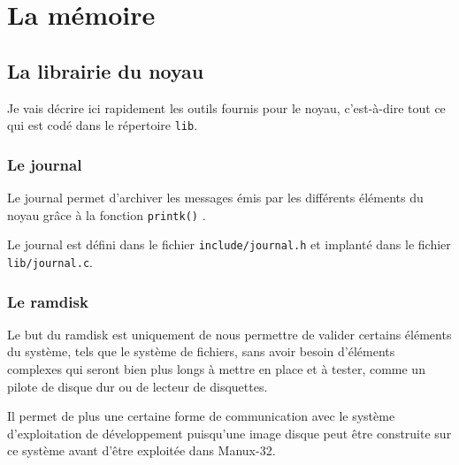 \documentclass{book}
\begin{document}
\chapter{La mémoire}


%
\section{La librairie du noyau}

   Je vais décrire ici rapidement les outils fournis pour le noyau,
c'est-à-dire tout ce qui est codé dans le répertoire {\tt lib}.

%
\subsection{Le journal}

   Le journal permet d'archiver les messages émis par les différents
éléments du noyau grâce à la fonction \lstinline!printk()!
.

   Le journal est défini dans le fichier {\tt include/journal.h} et implanté
dans le fichier {\tt lib/journal.c}.

%
\subsection{Le ramdisk}
 
   Le but du ramdisk est uniquement de nous permettre de valider
certains éléments du système, tels que le système de fichiers, sans
avoir besoin d'éléments complexes qui seront bien plus longs à mettre
en place et à tester, comme un pilote de disque dur ou de lecteur de
disquettes.

   Il permet de plus une certaine forme de communication avec le
système d'exploitation de développement puisqu'une image disque peut
être construite sur ce système avant d'être exploitée dans Manux-32.



\end{document}
